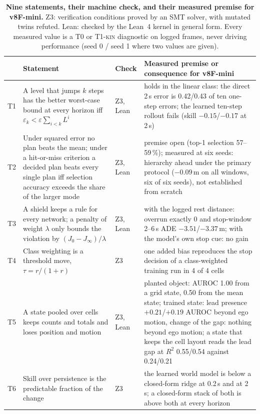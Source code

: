 \documentclass[10pt,twocolumn]{article}
\theoremstyle{remark}
\newcommand{\tier}[1]{\textsc{\small #1}}
\begin{document}
\begin{table}[t]
\centering
\caption{\textbf{Nine statements, their machine check, and their measured premise for v8F-mini.} Z3: verification conditions proved by
an SMT solver, with mutated twins refuted. Lean: checked by the Lean~4 kernel in general form. Every measured value is a \tier{T0} or
\tier{T1-kin} diagnostic on logged frames, never driving performance (seed 0 / seed 1 where two values are given).}
\label{tab:theory}
\small
\begin{tabularx}{\textwidth}{@{}l>{\raggedright\arraybackslash}p{60mm}l>{\raggedright\arraybackslash}X@{}}
\toprule
 & Statement & Check & Measured premise or consequence for v8F-mini \\
\midrule
T1 & A level that jumps $k$ steps has the better worst-case bound at every horizon iff $\varepsilon_k<\varepsilon\sum_{i<k}L^i$ & Z3, Lean &
holds in the linear class: the direct 2\,s error is 0.42/0.43 of ten one-step errors; the learned ten-step rollout fails (skill $-0.15$/$-0.17$ at 2\,s) \\
T2 & Under squared error no plan beats the mean; under a hit-or-miss criterion a decided plan beats every single plan iff selection accuracy exceeds the share of the larger mode & Z3, Lean &
premise open (top-1 selection 57--59\,\%); measured at six seeds: hierarchy ahead under the primary protocol ($-0.09$\,m on all windows, six of six seeds), not established from scratch \\
T3 & A shield keeps a rule for every network; a penalty of weight $\lambda$ only bounds the violation by $(J_0-J_\infty)/\lambda$ & Z3, Lean &
with the logged rest distance: overrun exactly 0 and stop-window 2--6\,s ADE $-3.51$/$-3.37$\,m; with the model's own stop cue: no gain \\
T4 & Class weighting is a threshold move, $\tau=r/(1+r)$ & Z3 &
one added bias reproduces the stop decision of a class-weighted training run in 4 of 4 cells \\
T5 & A state pooled over cells keeps counts and totals and loses position and motion & Z3, Lean &
planted object: AUROC 1.00 from a grid state, 0.50 from the mean state; trained state: lead presence $+0.21$/$+0.19$ AUROC beyond ego motion, change of the gap: nothing beyond ego motion; a state that keeps the cell layout reads the lead gap at $R^2$ 0.55/0.54 against 0.24/0.21 \\
T6 & Skill over persistence is the predictable fraction of the change & Z3 &
the learned world model is below a closed-form ridge at 0.2\,s and at 2\,s; a closed-form stack of both is above both at every horizon \\

\end{tabularx}
\end{table}
\end{document}
